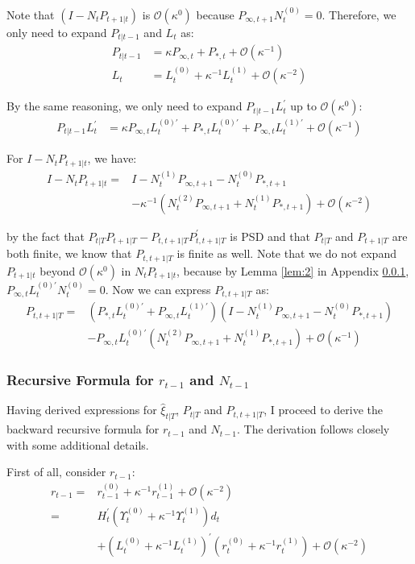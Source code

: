 \documentclass[10pt]{article}
\numberwithin{equation}{section}
\begin{document}
Note that $(I-N_tP_{t+1|t})$ is $\mathcal{O}(\kappa^0)$ because $P_{\infty,t+1}N_{t}^{(0)}=0$. Therefore, we only need to expand $P_{t|t-1}$ and $L_t$ as:
\begin{align*}
    P_{t|t-1} &= \kappa P_{\infty,t} + P_{*,t} + \mathcal{O}(\kappa^{-1}) \\
    L_t &= L_t^{(0)} + \kappa^{-1}L_t^{(1)} + \mathcal{O}(\kappa^{-2})
\end{align*}

By the same reasoning, we only need to expand $P_{t|t-1}L_t^{'}$ up to $\mathcal{O}(\kappa^0)$:
\begin{align*}
    P_{t|t-1}L_t^{'} &= \kappa P_{\infty,t}L_t^{(0)'}+P_{*,t}L_t^{(0)'}+P_{\infty,t}L_t^{(1)'}+\mathcal{O}(\kappa^{-1})
\end{align*}

For $I-N_tP_{t+1|t}$, we have:
\begin{align*}
    I-N_tP_{t+1|t} =& I-N_t^{(1)}P_{\infty,t+1}-N_t^{(0)}P_{*,t+1} \\
    &-\kappa^{-1}(N_t^{(2)}P_{\infty,t+1}+N_t^{(1)}P_{*,t+1})+\mathcal{O}(\kappa^{-2})
\end{align*}

by the fact that $P_{t|T}P_{t+1|T}-P_{t,t+1|T}P_{t,t+1|T}^{'}$ is PSD and that $P_{t|T}$ and $P_{t+1|T}$ are both finite, we know that $P_{t,t+1|T}$ is finite as well. Note that we do not expand $P_{t+1|t}$ beyond $\mathcal{O}(\kappa^0)$ in $N_tP_{t+1|t}$, because by Lemma \ref{lem:2} in Appendix \ref{ap:r_N}, $P_{\infty,t}L_t^{(0)'}N_t^{(0)}=0$. Now we can express $P_{t,t+1|T}$ as:
\begin{align*}
    P_{t,t+1|T} =& (P_{*,t}L_t^{(0)'}+P_{\infty,t}L_t^{(1)'})(I-N_t^{(1)}P_{\infty,t+1}-N_t^{(0)}P_{*,t+1}) \\
    &- P_{\infty,t}L_t^{(0)'}(N_t^{(2)}P_{\infty,t+1}+N_t^{(1)}P_{*,t+1}) + \mathcal{O}(\kappa^{-1})
\end{align*}

\subsubsection{Recursive Formula for $r_{t-1}$ and $N_{t-1}$} \label{ap:r_N}
Having derived expressions for $\hat{\xi}_{t|T}$, $P_{t|T}$ and $P_{t,t+1|T}$, I proceed to derive the backward recursive formula for $r_{t-1}$ and $N_{t-1}$. The derivation follows closely \cite{durbin_koopman_2003} with some additional details. 

First of all, consider $r_{t-1}$:
\begin{align*}
    r_{t-1} =& r_{t-1}^{(0)} + \kappa^{-1}r_{t-1}^{(1)} + \mathcal{O}(\kappa^{-2}) \\
    =& H_t^{'}(\Upsilon_t^{(0)}+ \kappa^{-1}\Upsilon_t^{(1)})d_t \\
    &+ (L_t^{(0)} + \kappa^{-1}L_t^{(1)})^{'}(r_t^{(0)}+\kappa^{-1}r_t^{(1)}) + \mathcal{O}(\kappa^{-2})
\end{align*}
\end{document}
